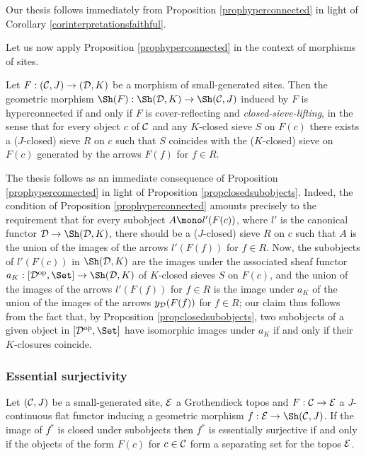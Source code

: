 \documentclass[a4paper,12pt]{article}
\begin{document}
\begin{proofs}
	Our thesis follows immediately from Proposition \ref{prophyperconnected} in light of Corollary \ref{corinterpretationsfaithful}. 
\end{proofs}

Let us now apply Proposition \ref{prophyperconnected} in the context of morphisms of sites.

\begin{proposition}\label{prophyperconnectedsites}
		Let $F:({\cal C}, J)\to ({\cal D}, K)$ be a morphism of small-generated sites. Then the geometric morphism $\Sh(F):\Sh({\cal D}, K) \to \Sh({\cal C}, J)$ induced by $F$ is hyperconnected if and only if $F$ is cover-reflecting and \emph{closed-sieve-lifting}, in the sense that for every object $c$ of $\cal C$ and any $K$-closed sieve $S$ on $F(c)$ there exists a ($J$-closed) sieve $R$ on $c$ such that $S$ coincides with the ($K$-closed) sieve on $F(c)$ generated by the arrows $F(f)$ for $f\in R$.   
\end{proposition}

\begin{proofs}
	The thesis follows as an immediate consequence of Proposition \ref{prophyperconnected} in light of Proposition \ref{propclosedsubobjects}. Indeed, the condition of Proposition \ref{prophyperconnected} amounts precisely to the requirement that for every subobject $A\mono l'(F(c))$, where $l'$ is the canonical functor ${\cal D}\to \Sh({\cal D}, K)$, there should be a ($J$-closed) sieve $R$ on $c$ such that  $A$ is the union of the images of the arrows $l'(F(f))$ for $f\in R$. Now, the subobjects of $l'(F(c))$ in $\Sh({\cal D}, K)$ are the images under the associated sheaf functor $a_{K}:[{\cal D}^{\textup{op}}, \Set]\to \Sh({\cal D}, K)$ of $K$-closed sieves $S$ on $F(c)$, and the union of the images of the arrows $l'(F(f))$ for $f\in R$ is the image under $a_{K}$ of the union of the images of the arrows $y_{\cal D}(F(f))$ for $f\in R$; our claim thus follows from the fact that, by Proposition \ref{propclosedsubobjects}, two subobjects of a given object in $[{\cal D}^{\textup{op}}, \Set]$ have isomorphic images under $a_{K}$ if and only if their $K$-closures coincide.   
\end{proofs}

\subsubsection{Essential surjectivity}

\begin{proposition}\label{propessentiallysurjective}
	Let $({\cal C}, J)$ be a small-generated site, $\cal E$ a Grothendieck topos and $F:{\cal C}\to {\cal E}$ a $J$-continuous flat functor inducing a geometric morphism $f:{\cal E}\to \Sh({\cal C}, J)$. If the image of $f^{\ast}$ is closed under subobjects then $f^{\ast}$ is essentially surjective if and only if the objects of the form $F(c)$ for $c\in {\cal C}$ form a separating set for the topos $\cal E$.  
\end{proposition}
\end{document}
